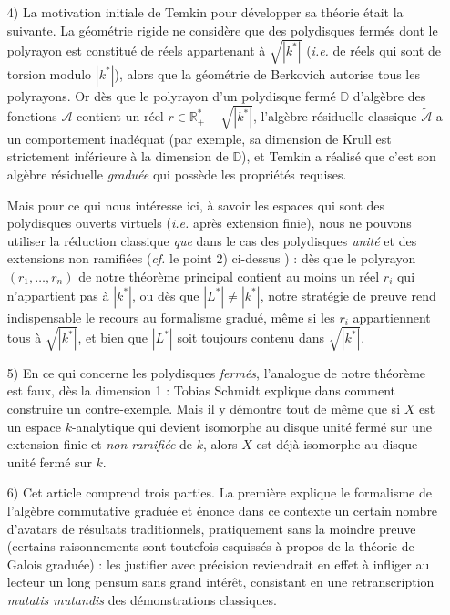\documentclass[10pt,leqno]{article}
\renewcommand{\Bbb}{\mathbb}
\renewcommand{\cal}{\mathscr}
\newcommand{\RR}{{\Bbb R}}
\newcommand{\DD}{{\Bbb D}}
\newcommand{\red}{\widetilde}
\begin{document}
\begin{itemize}
\medskip
\item[4)] La motivation initiale de Temkin pour développer sa théorie était la suivante. La géométrie rigide ne considère que des polydisques fermés dont le polyrayon est constitué de réels appartenant à $\sqrt{|k^*|}$ ({\em i.e.} de réels qui sont de torsion modulo $|k^*|$), alors que la géométrie de Berkovich autorise tous les polyrayons. Or dès que le polyrayon d'un polydisque fermé $\DD$ d'algèbre des fonctions $\cal A$ contient un réel $r\in \RR^*_+-\sqrt{|k^*|}$, l'algèbre résiduelle classique $\red{\cal A}$ a un comportement inadéquat (par exemple, sa dimension de Krull est strictement inférieure à la dimension de $\DD$), et Temkin a réalisé que c'est son algèbre résiduelle {\em graduée} qui possède les propriétés requises. 

\medskip
Mais pour ce qui nous intéresse ici, à savoir les espaces qui sont des polydisques ouverts virtuels ({\em i.e.} après extension finie), nous ne pouvons utiliser la réduction classique {\em que} dans le cas des polydisques {\em unité} et des extensions non ramifiées ({\em cf.} le point 2) ci-dessus ) : dès que le polyrayon $(r_1,\ldots,r_n)$ de notre théorème principal contient au moins un réel $r_i$ qui n'appartient pas à $|k^*|$, ou dès que $|L^*|\neq |k^*|$, notre stratégie de preuve rend indispensable le recours au formalisme gradué, même si les $r_i$ appartiennent tous à $\sqrt {|k^*|}$, et bien que $|L^*|$ soit toujours contenu dans $\sqrt {|k^*|}$. 

\medskip
\item[5)] En ce qui concerne les polydisques {\em fermés}, l'analogue de notre théorème est faux, dès la dimension 1 : Tobias Schmidt explique dans \cite{tbs} comment construire un contre-exemple. Mais il y démontre tout de même que si $X$ est un espace $k$-analytique qui devient isomorphe au disque unité fermé sur une extension finie et {\em non ramifiée} de $k$, alors $X$ est déjà isomorphe au disque unité fermé sur $k$. 

\medskip
\item[6)] Cet article comprend trois parties. La première explique le formalisme de l'algèbre commutative graduée et énonce dans ce contexte un certain nombre d'avatars de résultats traditionnels, pratiquement sans la moindre preuve (certains raisonnements sont toutefois esquissés à propos de la théorie de Galois graduée) : les justifier avec précision reviendrait en effet à infliger au lecteur un long pensum sans grand intérêt, consistant en une retranscription {\em mutatis mutandis} des démonstrations classiques. 



\end{itemize}
\end{document}
